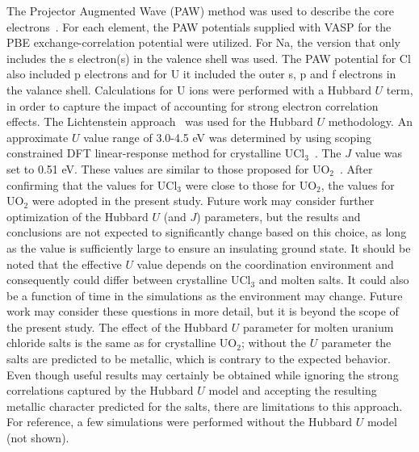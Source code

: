 \documentclass[titlepage=firstiscover,11pt,fleqn,headheight=14pt,footheight=40.8pt]{scrreprt}
\begin{document}
The Projector Augmented Wave (PAW) method was used to describe the core electrons~\cite{PAW1,PAW2}. For each element, the PAW potentials supplied with VASP for the PBE exchange-correlation potential were utilized. For Na, the version that only includes the s electron(s) in the valence shell was used. %
The PAW potential for Cl also included p electrons and for U it included the outer s, p and f electrons in the valance shell. %
Calculations for U ions were performed with a Hubbard $U$ term, in order to capture the impact of accounting for strong electron correlation effects. 
The Lichtenstein approach~\cite{PhysRevB.52.R5467} was used for the Hubbard $U$ methodology. An approximate $U$ value range of 3.0-4.5 eV was determined by using scoping constrained DFT linear-response method for crystalline UCl$_3$~\cite{PhysRevB.71.035105}. 
The $J$ value was set to 0.51 eV. These values are similar to those proposed for UO$_2$~\cite{dudarev}. After confirming that the values for UCl$_3$ were close to those for UO$_2$, the values for UO$_2$ were adopted in the present study. Future work may consider further optimization of the Hubbard $U$ (and $J$) parameters, but the results and conclusions are not expected to significantly change based on this choice, as long as the value is sufficiently large to ensure an insulating ground state. It should be noted that the effective $U$ value depends on the coordination environment and consequently could differ between crystalline UCl$_3$ and molten salts. It could also be a function of time in the simulations as the environment may change. Future work may consider these questions in more detail, but it is beyond the scope of the present study. The effect of the Hubbard $U$ parameter for molten uranium chloride salts is the same as for crystalline UO$_2$; without the $U$ parameter the salts are predicted to be metallic, which is contrary to the expected behavior. %
Even though useful results may certainly be obtained while ignoring the strong correlations captured by the Hubbard $U$  model and accepting the resulting metallic character predicted for the salts, there are limitations to this approach. For reference, a few simulations were performed without the Hubbard $U$ model (not shown). 
\end{document}
